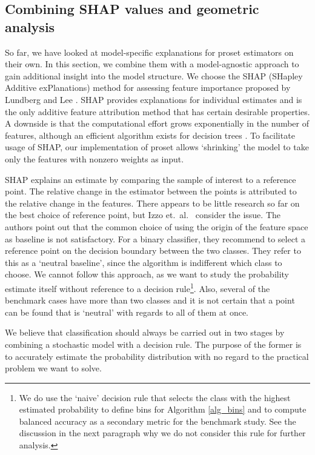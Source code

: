 \subsection{Combining SHAP values and geometric analysis}
\label{sec_shap_values}
%
So far, we have looked at model-specific explanations for proset estimators on their own.
In this section, we combine them with a model-agnostic approach to gain additional insight into the model structure.
We choose the SHAP (SHapley Additive exPlanations) method for assessing feature importance proposed by Lundberg and Lee \cite{Lundberg_17}.
SHAP provides explanations for individual estimates and is the only additive feature attribution method that has certain desirable properties.
A downside is that the computational effort grows exponentially in the number of features, although an efficient algorithm exists for decision trees \cite{Lundberg_18}.
To facilitate usage of SHAP, our implementation of proset allows `shrinking' the model to take only the features with nonzero weights as input.\par
%
SHAP explains an estimate by comparing the sample of interest to a reference point.
The relative change in the estimator between the points is attributed to the relative change in the features.
There appears to be little research so far on the best choice of reference point, but Izzo et.\ al.\ \cite{Izzo_20} consider the issue.
The authors point out that the common choice of using the origin of the feature space as baseline is not satisfactory.
For a binary classifier, they recommend to select a reference point on the decision boundary between the two classes.
They refer to this as a `neutral baseline', since the algorithm is indifferent which class to choose.
We cannot follow this approach, as we want to study the probability estimate itself without reference to a decision rule\footnote{
We do use the `naive' decision rule that selects the class with the highest estimated probability to define bins for Algorithm \ref{alg_bins} and to compute balanced accuracy as a secondary metric for the benchmark study.
See the discussion in the next paragraph why we do not consider this rule for further analysis.
}.
Also, several of the benchmark cases have more than two classes and it is not certain that a point can be found that is `neutral' with regards to all of them at once.\par
%
We believe that classification should always be carried out in two stages by combining a stochastic model with a decision rule.
The purpose of the former is to accurately estimate the probability distribution with no regard to the practical problem we want to solve.
